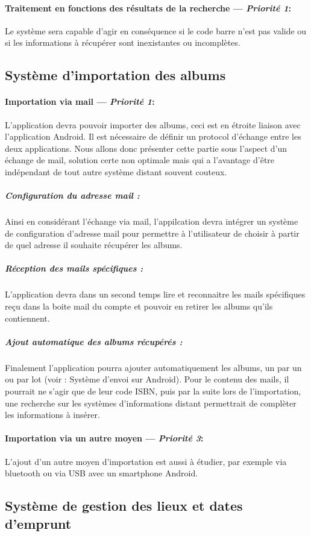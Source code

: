 \paragraph{Traitement en fonctions des résultats de la recherche ---  \textit{Priorité 1}:}  
Le système sera capable d'agir en conséquence si le code barre n'est pas valide ou si les informations à récupérer sont inexistantes ou incomplètes.

\subsection{Système d'importation des albums}
\paragraph{Importation via mail ---  \textit{Priorité 1}:}
L'application devra pouvoir importer des albums, ceci est en étroite liaison avec l'application Android. Il est nécessaire de définir un protocol d'échange entre les deux applications. Nous allons donc présenter cette partie sous l'aspect d'un échange de mail, solution certe non optimale mais qui a l'avantage d'être indépendant de tout autre système distant souvent couteux.
\subparagraph{Configuration du adresse mail :}  
Ainsi en considérant l'échange via mail, l'appilcation devra intégrer un système de configuration d'adresse mail pour permettre à l'utilisateur de choisir à partir de quel adresse il souhaite récupérer les albums.
\subparagraph{Réception des mails spécifiques :}  
L'application devra dans un second temps lire et reconnaitre les mails spécifiques reçu dans la boite mail du compte et pouvoir en retirer les albums qu'ils contiennent.
\subparagraph{Ajout automatique des albums récupérés :}  
Finalement l'application pourra ajouter automatiquement les albums, un par un ou par lot (voir : Système d'envoi sur Android). 
Pour le contenu des mails, il pourrait ne s'agir que de leur code ISBN, puis par la suite lors de l'importation, une recherche sur les systèmes d'informations distant permettrait de complèter les informations à insérer.
\paragraph{Importation via un autre moyen ---  \textit{Priorité 3}:}  
L'ajout d'un autre moyen d'importation est aussi à étudier, par exemple via bluetooth ou via USB avec un smartphone Android.

\subsection{Système de gestion des lieux et dates d'emprunt}
